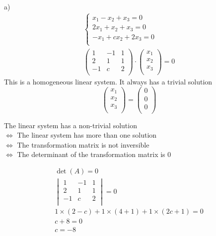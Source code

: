 \documentclass{article}
\begin{document}
a) 
\begin{gather*}
  \begin{cases}
    x_1 - x_2 + x_3 = 0 \\
    2x_1 + x_2 + x_3 = 0 \\
    -x_1 + cx_2 + 2x_3 = 0 \\
  \end{cases} \\
  \begin{pmatrix}
    1 & -1 & 1 \\
    2 & 1 & 1 \\
    -1 & c & 2 \\
  \end{pmatrix} \cdot
  \begin{pmatrix}
    x_1 \\
    x_2 \\
    x_3 \\
  \end{pmatrix} = 0
\end{gather*}
This is a homogeneous linear system. It always has a trivial solution 
\begin{equation*}
  \begin{pmatrix}
    x_1 \\
    x_2 \\
    x_3 \\
  \end{pmatrix} = 
  \begin{pmatrix}
    0 \\
    0 \\
    0 \\
  \end{pmatrix}
\end{equation*}

The linear system has a non-trivial solution \\
$\iff$ The linear system has more than one solution \\
$\iff$ The transformation matrix is not inversible \\
$\iff$ The determinant of the transformation matrix is 0

\begin{gather*}
  \det(A) = 0 \\
  \begin{vmatrix}
    1 & -1 & 1 \\
    2 & 1 & 1 \\
    -1 & c & 2 \\
  \end{vmatrix} = 0 \\
  1 \times (2 - c) + 1 \times (4 + 1) + 1 \times (2c + 1) = 0 \\
  c + 8 = 0 \\
  c = -8 \\
\end{gather*}
\end{document}
